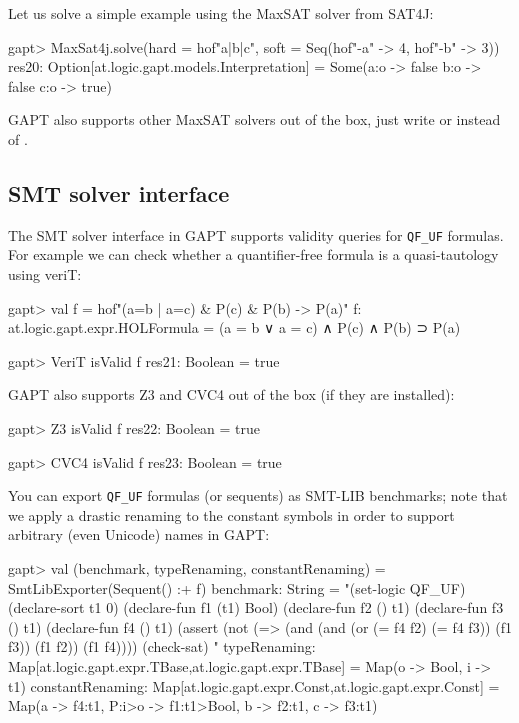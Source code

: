 \documentclass[a4paper,11pt]{article}
\newcommand{\cli}[1]{{\ttfamily {#1}}}
\begin{document}
Let us solve a simple example using the MaxSAT solver from SAT4J:

\begin{clilisting}
gapt> MaxSat4j.solve(hard = hof"a|b|c", soft = Seq(hof"-a" -> 4, hof"-b" -> 3))
res20: Option[at.logic.gapt.models.Interpretation] =
Some(a:o -> false
b:o -> false
c:o -> true)

\end{clilisting}

GAPT also supports other MaxSAT solvers out of the box, just write
\cli{OpenWBO} or \cli{ToySolver} instead of \cli{MaxSat4j}.

\subsection{SMT solver interface}

The SMT solver interface in GAPT supports validity queries for \verb,QF_UF,
formulas.  For example we can check whether a quantifier-free formula is a
quasi-tautology using veriT:
\begin{clilisting}
gapt> val f = hof"(a=b | a=c) & P(c) & P(b) -> P(a)"
f: at.logic.gapt.expr.HOLFormula = (a = b ∨ a = c) ∧ P(c) ∧ P(b) ⊃ P(a)

\end{clilisting}

\begin{clilisting}
gapt> VeriT isValid f
res21: Boolean = true

\end{clilisting}

GAPT also supports Z3 and CVC4 out of the box (if they are installed):
\begin{clilisting}
gapt> Z3 isValid f
res22: Boolean = true

gapt> CVC4 isValid f
res23: Boolean = true

\end{clilisting}

You can export \verb,QF_UF, formulas (or sequents) as SMT-LIB benchmarks;
note that we apply a drastic renaming to the constant symbols in order to
support arbitrary (even Unicode) names in GAPT:
\begin{clilisting}
gapt> val (benchmark, typeRenaming, constantRenaming) = SmtLibExporter(Sequent() :+ f)
benchmark: String =
"(set-logic QF_UF)
(declare-sort t1 0)
(declare-fun f1 (t1) Bool)
(declare-fun f2 () t1)
(declare-fun f3 () t1)
(declare-fun f4 () t1)
(assert (not (=> (and (and (or (= f4 f2) (= f4 f3)) (f1 f3)) (f1 f2)) (f1 f4))))
(check-sat)
"
typeRenaming: Map[at.logic.gapt.expr.TBase,at.logic.gapt.expr.TBase] = Map(o -> Bool, i -> t1)
constantRenaming: Map[at.logic.gapt.expr.Const,at.logic.gapt.expr.Const] = Map(a -> f4:t1, P:i>o -> f1:t1>Bool, b -> f2:t1, c -> f3:t1)

\end{clilisting}
\end{document}
